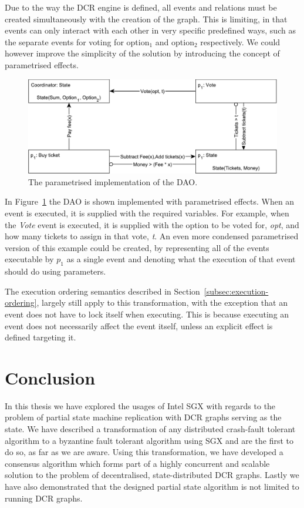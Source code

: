 \documentclass{article}
\begin{document}
	Due to the way the DCR engine is defined, all events and relations must be created simultaneously with the creation of the graph.
	This is limiting, in that events can only interact with each other in very specific predefined ways, such as the separate events for voting for option$_1$ and option$_2$ respectively.
	We could however improve the simplicity of the solution by introducing the concept of parametrised effects.

	\begin{figure}[t]
  	\includegraphics[width=\textwidth]{figures/dcr-graphs/dao-parametrised.pdf}
	  \caption{The parametrised implementation of the DAO.}
	  \label{fig:dao-parametrised}
	\end{figure}

	In Figure~\ref{fig:dao-parametrised} the DAO is shown implemented with parametrised effects.
	When an event is executed, it is supplied with the required variables.
	For example, when the \textit{Vote} event is executed, it is supplied with the option to be voted for, \textit{opt}, and how many tickets to assign in that vote, \textit{t}.
	An even more condensed parametrised version of this example could be created, by representing all of the events executable by $p_1$ as a single event and denoting what the execution of that event should do using parameters.

	The execution ordering semantics described in Section~\ref{subsec:execution-ordering}, largely still apply to this transformation, with the exception that an event does not have to lock itself when executing.
	This is because executing an event does not necessarily affect the event itself, unless an explicit effect is defined targeting it.

	\section{Conclusion}

	In this thesis we have explored the usages of Intel SGX with regards to the problem of partial state machine replication with DCR graphs serving as the state.
	We have described a transformation of any distributed crash-fault tolerant algorithm to a byzantine fault tolerant algorithm using SGX and are the first to do so, as far as we are aware.
	Using this transformation, we have developed a consensus algorithm which forms part of a highly concurrent and scalable solution to the problem of decentralised, state-distributed DCR graphs.
	Lastly we have also demonstrated that the designed partial state algorithm is not limited to running DCR graphs.
\end{document}
